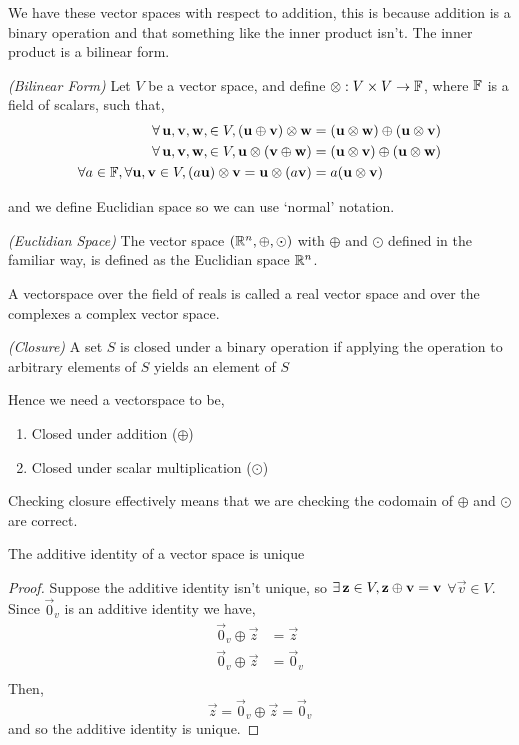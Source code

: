 \documentclass{article}
\begin{document}
We have these vector spaces with respect to addition, this is because addition is a binary operation and that something like the inner product isn't. The inner product is a bilinear form.

{\color{red}\begin{ndefi}{\textit{(Bilinear Form)}}
  Let $V$ be a vector space, and define $\otimes : V \times V \to \mathbb{F}$, where $\mathbb{F}$ is a field of scalars, such that,
  \begin{align*}
    \forall\, \boldsymbol{\mathbf{u}}, \boldsymbol{\mathbf{v}}, \boldsymbol{\mathbf{w}}, \in V, (\boldsymbol{\mathbf{u}} \oplus \boldsymbol{\mathbf{v}}) \otimes \boldsymbol{\mathbf{w}} &= (\boldsymbol{\mathbf{u}} \otimes \boldsymbol{\mathbf{w}}) \oplus (\boldsymbol{\mathbf{u}} \otimes \boldsymbol{\mathbf{v}})\\
    \forall\, \boldsymbol{\mathbf{u}}, \boldsymbol{\mathbf{v}}, \boldsymbol{\mathbf{w}}, \in V, \boldsymbol{\mathbf{u}} \otimes (\boldsymbol{\mathbf{v}} \oplus \boldsymbol{\mathbf{w}}) &= (\boldsymbol{\mathbf{u}} \otimes \boldsymbol{\mathbf{v}}) \oplus (\boldsymbol{\mathbf{u}} \otimes \boldsymbol{\mathbf{w}})\\
    \forall a \in \mathbb{F}, \forall \boldsymbol{\mathbf{u}}, \boldsymbol{\mathbf{v}} \in V, (a\boldsymbol{\mathbf{u}}) \otimes \boldsymbol{\mathbf{v}} = \boldsymbol{\mathbf{u}} \otimes (a\boldsymbol{\mathbf{v}}) &= a(\boldsymbol{\mathbf{u}} \otimes \boldsymbol{\mathbf{v}})
  \end{align*}
\end{ndefi}}
and we define Euclidian space so we can use `normal' notation.
\begin{ndefi}{\textit{(Euclidian Space)}}
  The vector space $(\mathbb{R}^n, \oplus, \odot)$ with $\oplus$ and $\odot$ defined in the familiar way, is defined as the Euclidian space $\mathbb{R}^n$.
\end{ndefi}

\begin{remark}
  A vectorspace over the field of reals is called a real vector space and over the complexes a complex vector space.
\end{remark}

\begin{ndefi}{\textit{(Closure)}}
  A set $S$ is closed under a binary operation if applying the operation to arbitrary elements of $S$ yields an element of $S$
\end{ndefi}

\noindent
Hence we need a vectorspace to be,
\begin{enumerate}
  \item Closed under addition ($\oplus$)
  \item Closed under scalar multiplication ($\odot$)
\end{enumerate}
Checking closure effectively means that we are checking the codomain of $\oplus$ and $\odot$ are correct.

\begin{nlemma}
  The additive identity of a vector space is unique
\end{nlemma}
\begin{proof}
  Suppose the additive identity isn't unique, so $\exists\,\boldsymbol{\mathbf{z}} \in V, \boldsymbol{\mathbf{z}} \oplus \boldsymbol{\mathbf{v}} = \boldsymbol{\mathbf{v}}$ $\forall \vec v \in V$. Since $\vec 0_v$ is an additive identity we have,
  \begin{align*}
    \vec 0_v \oplus \vec z &= \vec z\\
    \vec 0_v \oplus \vec z &= \vec 0_v\\
  \end{align*}
  Then,
  $$ \vec z = \vec 0_v \oplus \vec z = \vec 0_v $$
  and so the additive identity is unique.
\end{proof}
\end{document}
